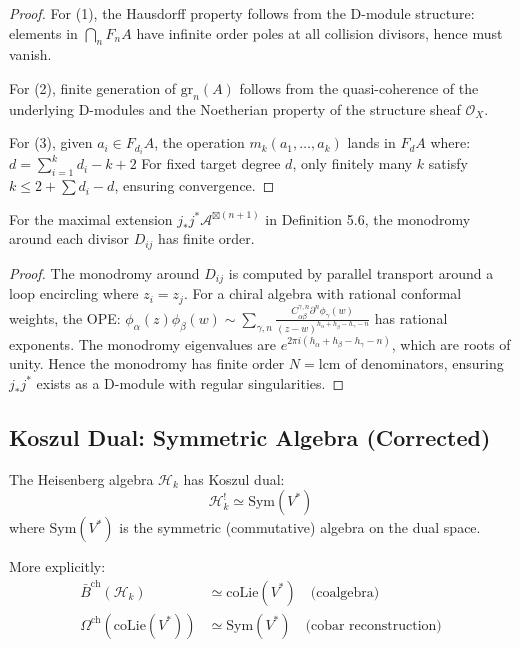 \begin{proof}
For (1), the Hausdorff property follows from the D-module structure: elements in $\bigcap_n F_nA$ have infinite order poles at all collision divisors, hence must vanish.

For (2), finite generation of $\text{gr}_n(A)$ follows from the quasi-coherence of the underlying D-modules and the Noetherian property of the structure sheaf $\mathcal{O}_X$.

For (3), given $a_i \in F_{d_i}A$, the operation $m_k(a_1, \ldots, a_k)$ lands in $F_d A$ where:
$d = \sum_{i=1}^k d_i - k + 2$
For fixed target degree $d$, only finitely many $k$ satisfy $k \leq 2 + \sum d_i - d$, ensuring convergence.
\end{proof}

\begin{theorem}\label{thm:monodromy-finite}
For the maximal extension $j_*j^*\mathcal{A}^{\boxtimes(n+1)}$ in Definition 5.6, the monodromy around each divisor $D_{ij}$ has finite order.
\end{theorem}

\begin{proof}
The monodromy around $D_{ij}$ is computed by parallel transport around a loop encircling where $z_i = z_j$. For a chiral algebra with rational conformal weights, the OPE:
$\phi_\alpha(z)\phi_\beta(w) \sim \sum_{\gamma,n} \frac{C^{\gamma,n}_{\alpha\beta}\partial^n\phi_\gamma(w)}{(z-w)^{h_\alpha + h_\beta - h_\gamma - n}}$
has rational exponents. The monodromy eigenvalues are $e^{2\pi i(h_\alpha + h_\beta - h_\gamma - n)}$, which are roots of unity. Hence the monodromy has finite order $N = \text{lcm}$ of denominators, ensuring $j_*j^*$ exists as a D-module with regular singularities.
\end{proof}

\subsection{Koszul Dual: Symmetric Algebra (Corrected)}

\begin{theorem}\label{thm:heisenberg-koszul-dual-early}
The Heisenberg algebra $\mathcal{H}_k$ has Koszul dual:
$$\mathcal{H}_k^! \simeq \text{Sym}(V^*)$$
where $\text{Sym}(V^*)$ is the symmetric (commutative) algebra on the dual space.

More explicitly:
\begin{align}
\bar{B}^{\text{ch}}(\mathcal{H}_k) &\simeq \text{coLie}(V^*) \quad \text{(coalgebra)} \\
\Omega^{\text{ch}}(\text{coLie}(V^*)) &\simeq \text{Sym}(V^*) \quad \text{(cobar reconstruction)}
\end{align}
\end{theorem}

